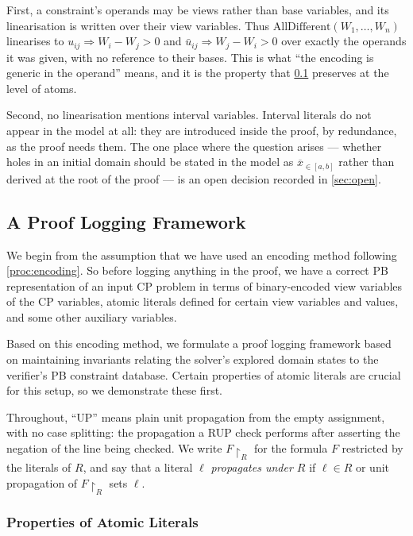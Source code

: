 \documentclass[11pt,a4paper]{article}
\theoremstyle{plain}
\theoremstyle{definition}
\theoremstyle{remark}
\newcommand{\globalcon}[1]{\ensuremath{\mathrm{#1}}}
\newcommand{\natin}[3]{\overline{#1}_{\in[#2,#3]}}
\begin{document}
First, a constraint's operands may be views rather than base variables, and its
linearisation is written over their view variables.  Thus
$\globalcon{AllDifferent}(W_1,\dots,W_n)$ linearises to
$u_{ij}\Rightarrow W_i - W_j > 0$ and $\bar u_{ij} \Rightarrow W_j - W_i > 0$
over exactly the operands it was given, with no reference to their bases.  This
is what ``the encoding is generic in the operand'' means, and it is the property
that \cref{sec:framework} preserves at the level of atoms.

Second, no linearisation mentions interval variables.  Interval literals do not
appear in the model at all: they are introduced inside the proof, by redundance,
as the proof needs them.  The one place where the question arises --- whether
holes in an initial domain should be stated in the model as
$\natin{x}{a}{b}$ rather than derived at the root of the proof --- is
an open decision recorded in \cref{sec:open}.

\subsection{A Proof Logging Framework}
\label{sec:framework}

We begin from the assumption that we have used an encoding method following
\cref{proc:encoding}.  So before logging anything in the proof, we have a
correct PB representation of an input CP problem in terms of binary-encoded
view variables of the CP variables, atomic literals defined for certain view
variables and values, and some other auxiliary variables.

Based on this encoding method, we formulate a proof logging framework based on
maintaining invariants relating the solver's explored domain states to the
verifier's PB constraint database.  Certain properties of atomic literals are
crucial for this setup, so we demonstrate these first.

Throughout, ``UP'' means plain unit propagation from the empty assignment, with
no case splitting: the propagation a RUP check performs after asserting the
negation of the line being checked.  We write $F\!\restriction_R$ for the
formula $F$ restricted by the literals of $R$, and say that a literal $\ell$
\emph{propagates under $R$} if $\ell\in R$ or unit propagation of
$F\!\restriction_R$ sets $\ell$.

\subsubsection{Properties of Atomic Literals}
\label{sec:atomprops}
\end{document}
